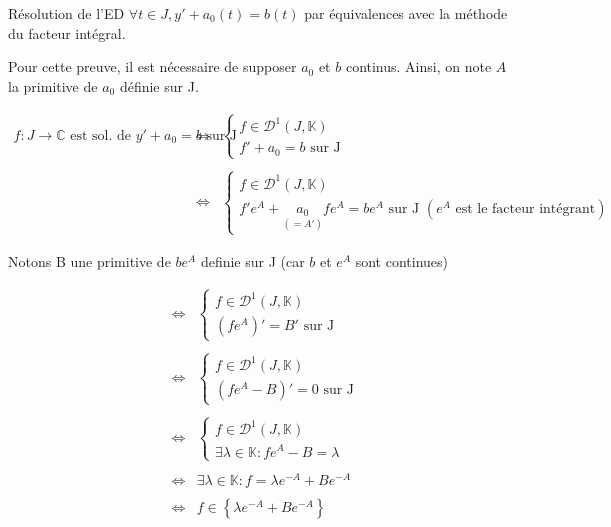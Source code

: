 \documentclass{article}
\date{10 novembre 2023}
\begin{document}
\maketitle

\begin{question_kholle}{Résolution de l'ED  $\forall t \in J, y' + a_{0}(t) = b(t)$ par équivalences avec la méthode du facteur intégral.}
	
	Pour cette preuve, il est nécessaire de supposer $a_{0}$ et $b$ continus.
	Ainsi, on note $A$ la primitive de $a_{0}$ définie sur J. 
  
  	$$\begin{array}{ccl}
  	f : J \to \mathbb{C} \text{ est sol. de } y' + a_{0} = b \text{ sur J} 
  	& \iff & \left\{ \begin{array}{l}
  		f \in \mathcal{D}^1 (J, \mathbb{K}) \\
  		f' + a_{0} = b \text{ sur J }
  	\end{array}  \right.                                                                                \\\\
  	& \iff & \left\{ \begin{array}{l}
  		f \in \mathcal{D}^1 (J, \mathbb{K}) \\
  		f'  e^A + \underset{(= A')}{a_{0}} f  e^A = b  e^A \text{ sur J } (e^A \text{ est le facteur intégrant})
  	\end{array}\right.        
  \end{array} $$
  
  Notons B une primitive de $be^A$ definie sur J (car $b$ et $e^A$ sont continues)
  
  $$\begin{array}{ccl}  	
   & \iff &  \left\{ \begin{array}{l}
  			f \in \mathcal{D}^1 (J, \mathbb{K}) \\
  			(fe^A)' = B' \text{ sur J}
  	\end{array} \right. \\\\
  	 & \iff &  \left\{ \begin{array}{l}
  		f \in \mathcal{D}^1 (J, \mathbb{K}) \\
  		(fe^A - B)' = 0 \text{ sur J}
  	\end{array} \right. \\\\
   & \iff &  \left\{ \begin{array}{l}
  	f \in \mathcal{D}^1 (J, \mathbb{K}) \\
  	\exists \lambda \in \mathbb{K} : fe^A - B = \lambda
  \end{array} \right. \\\\
  & \iff & \exists \lambda \in \mathbb{K} : f = \lambda e^{-A} + B e^{-A} \\\\
  & \iff & f \in \left\lbrace \lambda e^{-A} + B e^{-A} \right\rbrace 
  \end{array} $$
  

\end{question_kholle}
\end{document}
